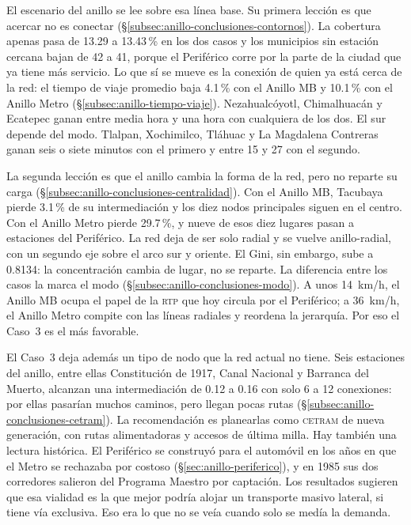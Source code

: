 El escenario del anillo se lee sobre esa línea base. Su primera lección es que
acercar no es conectar (§\ref{subsec:anillo-conclusiones-contornos}). La
cobertura apenas pasa de 13.29 a 13.43\,\% en los dos casos y los municipios
sin estación cercana bajan de 42 a 41, porque el Periférico corre por la parte
de la ciudad que ya tiene más servicio. Lo que sí se mueve es la conexión de
quien ya está cerca de la red: el tiempo de viaje promedio baja 4.1\,\% con el
Anillo MB y 10.1\,\% con el Anillo Metro (§\ref{subsec:anillo-tiempo-viaje}).
Nezahualcóyotl, Chimalhuacán y Ecatepec ganan entre media hora y una hora con
cualquiera de los dos. El sur depende del modo. Tlalpan, Xochimilco, Tláhuac y
La Magdalena Contreras ganan seis o siete minutos con el primero y entre 15 y
27 con el segundo.

La segunda lección es que el anillo cambia la forma de la red, pero no reparte
su carga (§\ref{subsec:anillo-conclusiones-centralidad}). Con el Anillo MB,
Tacubaya pierde 3.1\,\% de su intermediación y los diez nodos principales siguen
en el centro. Con el Anillo Metro pierde 29.7\,\%, y nueve de esos diez lugares
pasan a estaciones del Periférico. La red deja de ser solo radial y se vuelve
anillo-radial, con un segundo eje sobre el arco sur y oriente. El Gini, sin
embargo, sube a 0.8134: la concentración cambia de lugar, no se reparte. La
diferencia entre los casos la marca el modo
(§\ref{subsec:anillo-conclusiones-modo}). A unos 14~km/h, el Anillo MB ocupa el
papel de la \textsc{rtp} que hoy circula por el Periférico; a 36~km/h, el Anillo
Metro compite con las líneas radiales y reordena la jerarquía. Por eso el
Caso~3 es el más favorable.

El Caso~3 deja además un tipo de nodo que la red actual no tiene. Seis
estaciones del anillo, entre ellas Constitución de 1917, Canal Nacional y
Barranca del Muerto, alcanzan una intermediación de 0.12 a 0.16 con solo 6 a 12
conexiones: por ellas pasarían muchos caminos, pero llegan pocas rutas
(§\ref{subsec:anillo-conclusiones-cetram}). La recomendación es planearlas como
\textsc{cetram} de nueva generación, con rutas alimentadoras y accesos de
última milla. Hay también una lectura histórica. El Periférico se construyó para
el automóvil en los años en que el Metro se rechazaba por costoso
(§\ref{sec:anillo-periferico}), y en 1985 sus dos
corredores salieron del Programa Maestro por captación. Los resultados sugieren
que esa vialidad es la que mejor podría alojar un transporte masivo lateral, si
tiene vía exclusiva. Eso era lo que no se veía cuando solo se medía la demanda.

